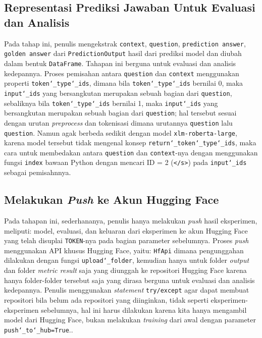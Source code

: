 \subsection{Representasi Prediksi Jawaban Untuk Evaluasi dan Analisis}
Pada tahap ini, penulis mengekstrak \texttt{context}, \texttt{question}, \texttt{prediction answer}, \texttt{golden answer} dari \texttt{PredictionOutput} hasil dari prediksi model dan diubah dalam bentuk \texttt{DataFrame}. Tahapan ini berguna untuk evaluasi dan analisis kedepannya. Proses pemisahan antara \texttt{question} dan \texttt{context} menggunakan properti \texttt{token\char`_type\char`_ids}, dimana bila \texttt{token\char`_type\char`_ids} bernilai 0, maka \texttt{input\char`_ids} yang bersangkutan merupakan sebuah bagian dari \texttt{question}, sebaliknya bila \texttt{token\char`_type\char`_ids} bernilai 1, maka \texttt{input\char`_ids} yang bersangkutan merupakan sebuah bagian dari \texttt{question}; hal tersebut sesuai dengan urutan \emph{preprocess} dan tokenisasi dimana urutannya \texttt{question} lalu \texttt{question}. Namun agak berbeda sedikit dengan model \texttt{xlm-roberta-large}, karena model tersebut tidak mengenal konsep \texttt{return\char`_token\char`_type\char`_ids}, maka cara untuk membedakan antara \texttt{question} dan \texttt{context}-nya dengan menggunakan fungsi \texttt{index} bawaan Python dengan mencari ID = 2 (\texttt{</s>}) pada \texttt{input\char`_ids} sebagai pemisahnnya. 

\subsection{Melakukan \emph{Push} ke Akun Hugging Face}
Pada tahapan ini, sederhananya, penulis hanya melakukan \emph{push} hasil eksperimen, meliputi: model, evaluasi, dan keluaran dari eksperimen ke akun Hugging Face yang telah disuplai \texttt{TOKEN}-nya pada bagian parameter sebelumnya. Proses \emph{push} menggunakan API khusus Hugging Face, yaitu: \texttt{HfApi} dimana pengunggahan dilakukan dengan fungsi \texttt{upload\char`_folder}, kemudian hanya untuk folder \emph{output} dan folder \emph{metric result} saja yang diunggah ke repositori Hugging Face karena hanya folder-folder tersebut saja yang dirasa berguna untuk evaluasi dan analisis kedepannya. Penulis menggunakan \emph{statement} \texttt{try/except} agar dapat membuat repositori bila belum ada repositori yang diinginkan, tidak seperti eksperimen-eksperimen sebelumnya, hal ini harus dilakukan karena kita hanya mengambil model dari Hugging Face, bukan melakukan \emph{training} dari awal dengan parameter \texttt{push\char`_to\char`_hub=True}..